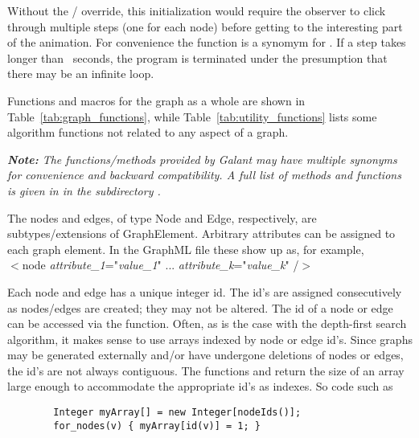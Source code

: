 Without the /
override, this initialization would require the observer to click
through multiple steps (one for each node) before getting to the interesting
part of the animation.
For convenience the function  is a synomym for .
If a step takes longer than \Timeout\ seconds, the program is terminated
under the presumption that there may be an infinite loop.





Functions and macros for the graph as a whole are shown in Table~\ref{tab:graph_functions}, while Table~\ref{tab:utility_functions} lists some algorithm functions not related to any aspect of a graph.

\emph{\textbf{Note:} The functions/methods provided by Galant may have multiple synonyms for
convenience and backward compatibility. A full list of methods and functions
is given in  in the subdirectory
.}

The nodes and edges, of type \textsf{Node} and \textsf{Edge}, respectively,
are subtypes/extensions of \textsf{GraphElement}.
Arbitrary attributes can be assigned to each graph element. In the GraphML file
these show up as, for example,\\
\hspace*{3em}
\textsf{
$<$node \emph{attribute\_1}="\emph{value\_1}" ... \emph{attribute\_k}="\emph{value\_k}" /$>$
}

Each node and edge has a unique integer id.
The id's are assigned consecutively as nodes/edges are created;
they may not be altered.
The id of a node or edge can be accessed via the  function.
Often, as is the case with the depth-first search algorithm, it makes sense to use
arrays indexed by node or edge id's.
Since graphs may be generated externally and/or have undergone deletions of nodes or
edges, the id's are not always contiguous.
The functions  and  return the size of an array
large enough to accommodate the appropriate id's as indexes. So code such as

\begin{minipage}{0.8\textwidth}
\begin{verbatim}
        Integer myArray[] = new Integer[nodeIds()];
        for_nodes(v) { myArray[id(v)] = 1; }
\end{verbatim}
\end{minipage}


